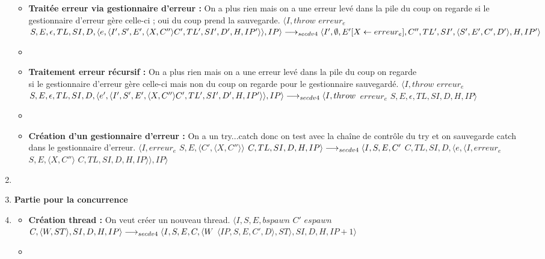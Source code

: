 \documentclass[10pt,a4paper]{article}
\begin{document}
\begin{enumerate}
\begin{itemize}
					\item[] \textbf{Traitée erreur via gestionnaire d'erreur :} On a plus rien mais on a une erreur levé dans la pile du coup on regarde si le gestionnaire d'erreur gère celle-ci ; oui du coup prend la sauvegarde.
					\smallbreak 
					$\langle I,throw$ $erreur_{e}$ $S,E,\epsilon,TL,SI,D,\langle e,\langle I',S',E',\langle X,C'' \rangle C',TL',SI',D',H,IP'\rangle\rangle,IP\rangle \\\longrightarrow_{secdv4} \langle I',\emptyset,E'[X \leftarrow erreur_{e}],C'',TL',SI',\langle S',E',C',D'\rangle,H,IP'\rangle$
					\item[]
					
					\item[]  \textbf{Traitement erreur récursif :} On a plus rien mais on a une erreur levé dans la pile du coup on regarde 
					\\si le gestionnaire d'erreur gère celle-ci mais non du coup on regarde pour le gestionnaire sauvegardé.
					\smallbreak 
					$\langle I,throw$ $erreur_{e}$ $S,E,\epsilon,TL,SI,D,\langle e',\langle I',S',E',\langle X,C'' \rangle C',TL',SI',D',H,IP'\rangle\rangle,IP\rangle \\\longrightarrow_{secdv4}\langle I,throw$ $erreur_{e}$ $S,E,\epsilon,TL,SI,D,H,IP\rangle$
					\item[]
					\newpage
					
					\item[]  \textbf{Création d'un gestionnaire d'erreur :} On a un try...catch donc on test avec la chaîne de contrôle du try et on sauvegarde catch dans le gestionnaire d'erreur.
					\smallbreak 
					$\langle I,erreur_{e}$ $S,E,\langle C',\langle X,C''\rangle\rangle$ $C,TL,SI,D,H,IP\rangle 
					\\\longrightarrow_{secdv4} \langle I,S,E,C'$ $C,TL,SI,D,\langle e,\langle I,erreur_{e}$ $S,E,\langle X,C'' \rangle$ $C,TL,SI,D,H,IP\rangle\rangle,IP\rangle$
				\end{itemize}
				
				\item[]
				
				
				
				
				\item[] \textbf{Partie pour la concurrence} 
				\item[]
				\begin{itemize}
					\item[]  \textbf{Création thread :} On veut créer un nouveau thread.
					\smallbreak $\langle I,S,E,bspawn$ $C'$ $espawn$ $C,\langle W,ST\rangle,SI,D,H,IP\rangle 
					\\\longrightarrow_{secdv4} \langle I,S,E,C,\langle W$ $\langle IP,S,E,C',D\rangle,ST\rangle,SI,D,H,IP+1\rangle$
					\item[]
					

\end{itemize}
\end{enumerate}
\end{document}
